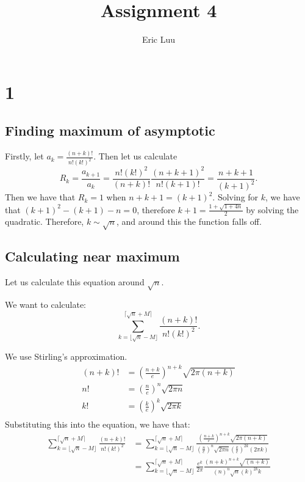 \documentclass[]{article}
\title{Assignment 4}
\author{Eric Luu}
\begin{document}
\maketitle
\section{1}
\subsection{Finding maximum of asymptotic}
Firstly, let $a_k = \frac{(n + k)!}{n!(k!)^2}$. Then let us calculate 
\begin{equation}
	R_k = \frac{a_{k + 1}}{a_k} = \frac{n!(k!)^2}{(n + k)!}\frac{(n + k + 1)^2}{n! (k + 1)!} = \frac{n + k + 1}{(k + 1)^2}. 
\end{equation}
Then we have that $R_k = 1$ when $n + k + 1 = (k + 1)^2$. Solving for $k$, we have that $(k + 1)^2 - (k + 1) - n = 0$, therefore $k + 1 = \frac{1 + \sqrt{1 + 4n}}{2}$ by solving the quadratic. Therefore, $k \sim \sqrt{n}$, and around this the function falls off. 
\subsection{Calculating near maximum}
Let us calculate this equation around $\sqrt{n}$. 

We want to calculate:
\begin{equation}
	\sum_{k = \lfloor \sqrt{n} - M \rfloor }^{ \lceil \sqrt{n} + M \rceil}  \frac{(n + k)!}{n!(k!)^2}.
\end{equation}

We use Stirling's approximation.
\begin{align*}
	(n + k)! &= \left(\frac{n + k}{e}\right)^{n + k}\sqrt{2\pi (n + k)}\\
	n! &= \left(\frac{n}{e}\right)^n \sqrt{2 \pi n}\\
	k! &= \left(\frac{k}{e}\right)^k \sqrt{2 \pi k}\\
\end{align*}
Substituting this into the equation, we have that:
\begin{align*}
	\sum_{k = \lfloor \sqrt{n} - M \rfloor }^{ \lceil \sqrt{n} + M \rceil}  \frac{(n + k)!}{n!(k!)^2}
	&=
	\sum_{k = \lfloor \sqrt{n} - M \rfloor }^{ \lceil \sqrt{n} + M \rceil} \frac{\left(\frac{n + k}{e}\right)^{n + k}\sqrt{2\pi (n + k)}}{\left(\frac{n}{e}\right)^n \sqrt{2 \pi n} \left(\frac{k}{e}\right)^{2k} (2 \pi k)}\\
	&=
	\sum_{k = \lfloor \sqrt{n} - M \rfloor }^{ \lceil \sqrt{n} + M \rceil} \frac{e^{k}}{2\pi} \frac{\left(n + k\right)^{n + k}\sqrt{(n + k)}}{\left(n\right)^n \sqrt{n} \left(k\right)^{2k}k }\\
\end{align*}
\end{document}

